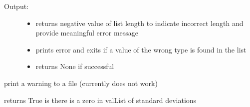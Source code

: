 \documentclass[letterpaper,10pt,english]{sphinxmanual}
\begin{document}
\begin{fulllineitems}
\begin{fulllineitems}
\begin{description}
\item[{Output:}] \leavevmode\begin{itemize}
\item {} 
returns negative value of list length to indicate incorrect length and provide meaningful error message

\item {} 
prints error and exits if a value of the wrong type is found in the list

\item {} 
returns None if successful

\end{itemize}

\end{description}

\end{fulllineitems}


\begin{fulllineitems}
\label{\detokenize{pydfnworks:pydfnworks.dfnGen.gen_input.input_helper.warning}}
print a warning to a file (currently does not work)

\end{fulllineitems}


\begin{fulllineitems}
\label{\detokenize{pydfnworks:pydfnworks.dfnGen.gen_input.input_helper.zero_in_std_devs}}
returns True is there is a zero in valList of standard deviations

\end{fulllineitems}


\end{fulllineitems}

\label{\detokenize{pydfnworks:module-pydfnworks.dfnGen.distributions}}
\end{document}
